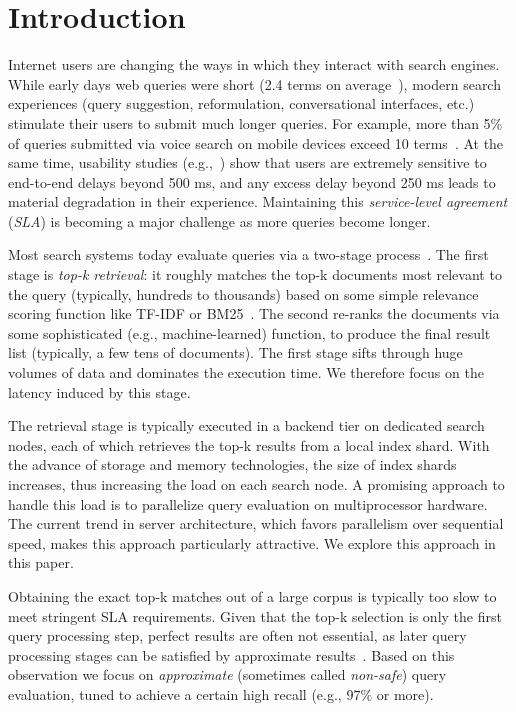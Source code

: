 \section{Introduction}
\label{sec:intro}

Internet users are changing the ways in which they interact with search engines. 
While  early days web queries were short (2.4 terms on average~\cite{Spink:2001:SWP:362968.362979}), 
modern search experiences (query suggestion, reformulation, conversational interfaces, etc.) stimulate their users to submit much longer queries. 
For example, more than 5\% of queries submitted via voice search on mobile devices exceed 10 terms~\cite{sigir/Guy16}. 
At the same time, usability studies
(e.g.,~\cite{Arapakis:2014:IRL:2600428.2609627}) show that users are extremely sensitive to end-to-end delays beyond 500 ms, 
and any excess delay beyond 250 ms leads to material degradation in their experience. Maintaining this \emph{service-level agreement} ({\em SLA}) 
is becoming a major challenge as more queries become longer.

 Most search systems today evaluate queries via a two-stage process~\cite{Wang:2011}. 
The first stage is \emph{top-k retrieval}: it 
 roughly matches the top-k documents most relevant to the query (typically, hundreds to thousands) based on some simple relevance scoring function like TF-IDF or BM25~\cite{Baeza-Yates:1999:MIR:553876}. The second  re-ranks the  documents via some sophisticated (e.g., machine-learned) function, to produce the final result list (typically, a few tens of documents). 
The first stage  sifts through huge volumes of data and dominates the execution time. 
We therefore focus on the latency induced by this stage. 

The retrieval stage is typically executed in a backend  tier on dedicated search nodes, each of which retrieves the top-k results from a local index shard. 
With the advance of storage and memory technologies, the size of index shards increases, thus increasing the load on each search node. 
A promising approach to handle this load is to  parallelize query evaluation on multiprocessor hardware. 
The current trend in server architecture, which favors parallelism over sequential speed, makes this approach particularly attractive. 
We explore this approach in this paper.


Obtaining the exact top-k matches out of a large corpus is typically too slow to meet stringent SLA requirements. 
Given that the top-k selection is only the first query  processing step, perfect results are often not essential, as later query processing 
stages can be satisfied by approximate results~\cite{Lin:2015}. Based on this observation we focus on \emph{approximate} 
(sometimes called \emph{non-safe}) query evaluation, tuned to achieve a certain high recall (e.g., $97\%$ or more). 

